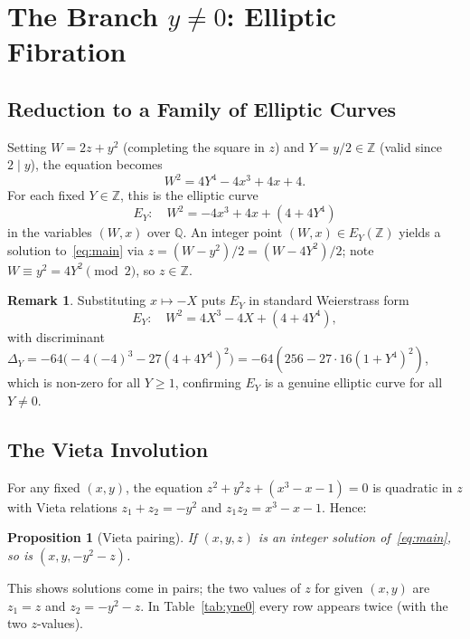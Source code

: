 \documentclass[12pt,a4paper]{article}
\newtheorem{proposition}[theorem]{Proposition}
\theoremstyle{definition}
\newtheorem{remark}[theorem]{Remark}
\newcommand{\Z}{\mathbb{Z}}
\newcommand{\Q}{\mathbb{Q}}
\begin{document}
\section{The Branch \texorpdfstring{$y\ne0$}{y≠0}: Elliptic Fibration}
\label{sec:yne0}

\subsection{Reduction to a Family of Elliptic Curves}

Setting $W = 2z + y^2$ (completing the square in $z$) and $Y = y/2 \in \Z$
(valid since $2\mid y$), the equation becomes
\begin{equation}\label{eq:surface}
  W^2 = 4Y^4 - 4x^3 + 4x + 4.
\end{equation}
For each fixed $Y\in\Z$, this is the elliptic curve
\[
  E_Y:\quad W^2 = -4x^3 + 4x + (4 + 4Y^4)
\]
in the variables $(W,x)$ over $\Q$.  An integer point $(W,x)\in E_Y(\Z)$
yields a solution to~\eqref{eq:main} via $z = (W-y^2)/2 = (W - 4Y^2)/2$;
note $W \equiv y^2 = 4Y^2 \pmod{2}$, so $z\in\Z$.

\begin{remark}
  Substituting $x \mapsto -X$ puts $E_Y$ in standard Weierstrass form
  \[
    E_Y:\quad W^2 = 4X^3 - 4X + (4+4Y^4),
  \]
  with discriminant $\Delta_Y = -64\bigl(-4(-4)^3 - 27(4+4Y^4)^2\bigr)
  = -64(256 - 27\cdot16(1+Y^4)^2)$, which is non-zero for all $Y\ge1$,
  confirming $E_Y$ is a genuine elliptic curve for all $Y\ne0$.
\end{remark}

\subsection{The Vieta Involution}

For any fixed $(x,y)$, the equation $z^2 + y^2 z + (x^3-x-1) = 0$ is
quadratic in $z$ with Vieta relations $z_1 + z_2 = -y^2$ and
$z_1 z_2 = x^3-x-1$.  Hence:

\begin{proposition}[Vieta pairing]\label{prop:vieta}
  If $(x,y,z)$ is an integer solution of~\eqref{eq:main}, so is
  $(x,y,-y^2-z)$.
\end{proposition}

This shows solutions come in pairs; the two values of $z$ for given $(x,y)$
are $z_1 = z$ and $z_2 = -y^2 - z$.  In Table~\ref{tab:yne0} every row
appears twice (with the two $z$-values).
\end{document}
